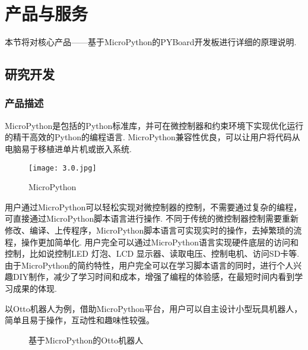 ﻿\section{产品与服务}
本节将对核心产品——基于MicroPython的PYBoard开发板进行详细的原理说明.
\subsection{研究开发}
\subsubsection{产品描述}
MicroPython是包括的Python标准库，并可在微控制器和约束环境下实现优化运行的精干高效的Python的编程语言.
MicroPython兼容性优良，可以让用户将代码从电脑易于移植进单片机或嵌入系统.

\begin{figure}[H]
\centering
\texttt{[image: 3.0.jpg]}
\caption{MicroPython}
\label{MicroPython}
\end{figure}

用户通过MicroPython可以轻松实现对微控制器的控制，不需要通过复杂的编程，可直接通过MicroPython脚本语言进行操作.
不同于传统的微控制器控制需要重新修改、编译、上传程序，MicroPython脚本语言可实现实时的操作，去掉繁琐的流程，操作更加简单化.
用户完全可以通过MicroPython语言实现硬件底层的访问和控制，比如说控制LED 灯泡、LCD 显示器、读取电压、控制电机、访问SD卡等.
由于MicroPython的简约特性，用户完全可以在学习脚本语言的同时，进行个人兴趣DIY制作，减少了学习时间和成本，增强了编程的体验感，在最短时间内看到学习成果的体现.

以Otto机器人为例，借助MicroPython平台，用户可以自主设计小型玩具机器人，简单且易于操作，互动性和趣味性较强。

\begin{figure}[H]
\centering
{}%
%
\caption{基于MicroPython的Otto机器人}
\label{基于MicroPython的Otto机器人}
\end{figure}

